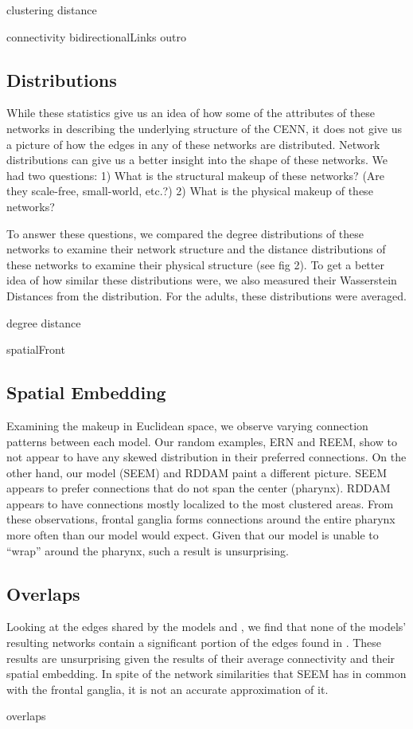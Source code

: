 {clustering}
{distance}

{connectivity}
{bidirectionalLinks}
{outro}

\subsection{Distributions}

While these statistics give us an idea of how some of the attributes of these networks in describing the underlying structure of the CENN, it does not give us a picture of how the edges in any of these networks are distributed. 
Network distributions can give us a better insight into the shape of these networks.
We had two questions: 
1) What is the structural makeup of these networks? (Are they scale-free, small-world, etc.?) 
2) What is the physical makeup of these networks?

To answer these questions, we compared the degree distributions of these networks to examine their network structure and the distance distributions of these networks to examine their physical structure (see fig 2). 
To get a better idea of how similar these distributions were, we also measured their Wasserstein Distances from the \ce distribution. 
For the adults, these distributions were averaged.

{degree}
{distance}

{spatialFront}

\subsection{Spatial Embedding} %
Examining the makeup in Euclidean space, we observe varying connection patterns between each model. 
Our random examples, ERN and REEM, show to not appear to have any skewed distribution in their preferred connections. 
On the other hand, our model (SEEM) and RDDAM paint a different picture. 
SEEM appears to prefer connections that do not span the center (pharynx). 
RDDAM appears to have connections mostly localized to the most clustered areas.
From these observations, \ce frontal ganglia forms connections around the entire pharynx more often than our model would expect.
Given that our model is unable to ``wrap'' around the pharynx, such a result is unsurprising.

\subsection{Overlaps} %
Looking at the edges shared by the models and \ce, we find that none of the models' resulting networks contain a significant portion of the edges found in \ce. 
These results are unsurprising given the results of their average connectivity and their spatial embedding.
In spite of the network similarities that SEEM has in common with the \ce frontal ganglia, it is not an accurate approximation of it.

{overlaps}